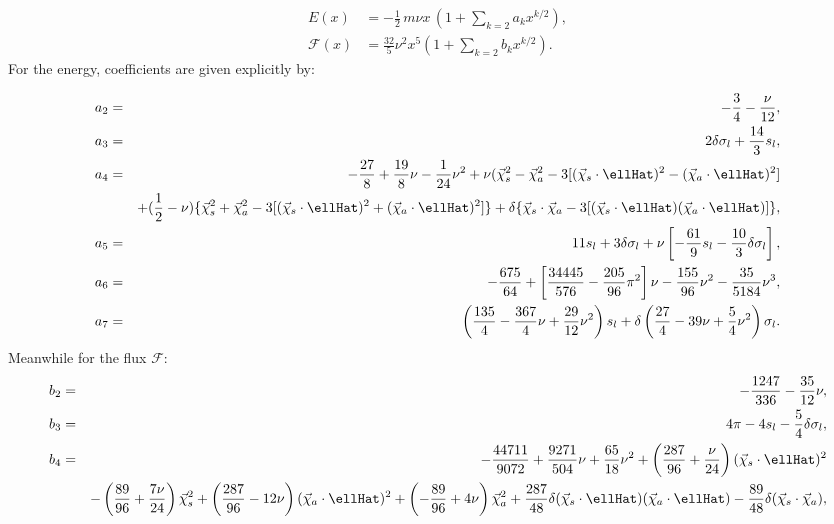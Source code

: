 \begin{eqnarray}
E(x) &= -\frac{1}{2}\,m\nu x\,\left(1+\sum_{k=2}a_{k}x^{k/2}\right), \label{eq:EExpansion} \\
\mathcal{F}(x) &= \frac{32}{5}\nu^{2}x^{5}\left(1+\sum_{k=2}
  b_{k}x^{k/2}\right).
\label{eq:FExpansion}
\end{eqnarray}
For the energy, coefficients are given explicitly by:
\begin{widetext}
\begin{eqnarray}
a_{2} &=& -\frac{3}{4} - \frac{\nu}{12}, \\
a_{3} &=&  2\delta\sigma_{l}+\frac{14}{3}s_{l}, \\
a_{4} &=& -\frac{27}{8} + \frac{19}{8}\nu - \frac{1}{24}\nu^{2} +
\nu{(\vec{\chi}_{s}^{2}-\vec{\chi}_{a}^{2} -
  3[(\vec{\chi}_{s}\cdot\ellHat)^{2} -
  (\vec{\chi}_{a}\cdot\ellHat)^{2}]} \nonumber \\
  &&+ (\frac{1}{2}-\nu)\{ \vec{\chi}_{s}^{2}+\vec{\chi}_{a}^2-3[(\vec{\chi}_{s}\cdot\ellHat)^{2} + (\vec{\chi}_{a}\cdot\ellHat)^{2}]\}+\delta\{\vec{\chi}_{s}\cdot\vec{\chi}_{a} - 3[(\vec{\chi}_{s}\cdot\ellHat)(\vec{\chi}_{a}\cdot\ellHat)]\},
\label{eq:Energy-a4}\\
a_{5} &=& 11s_{l} + 3\delta\sigma_{l} + \nu\left[-\frac{61}{9}s_{l} - \frac{10}{3}\delta\sigma_{l}\right],\\
a_{6} & =& -\frac{675}{64} + \left[\frac{34445}{576}-\frac{205}{96}\pi^{2}\right]\nu - \frac{155}{96}\nu^{2}-\frac{35}{5184}\nu^{3},\\
a_{7} &=& \left(\frac{135}{4} - \frac{367}{4}\nu + \frac{29}{12}\nu^{2}\right)s_{l} + \delta\left(\frac{27}{4}-39\nu+\frac{5}{4}\nu^{2}\right)\sigma_l.
\end{eqnarray}
Meanwhile for the flux $\mathcal{F}$:
\begin{eqnarray}
b_{2} &=& -\frac{1247}{336}-\frac{35}{12}\nu, \\
b_{3} &=& 4\pi - 4s_l - \frac{5}{4}\delta\sigma_{l}, \\
b_{4} &=& -\frac{44711}{9072} + \frac{9271}{504}\nu + \frac{65}{18}\nu^{2}  + \left(\frac{287}{96}+\frac{\nu}{24}\right)(\vec{\chi}_{s}\cdot\ellHat)^{2}\nonumber\\
&&- \left(\frac{89}{96}+\frac{7\nu}{24}\right)\vec{\chi}_{s}^{2} + \left(\frac{287}{96}-12\nu\right)(\vec{\chi}_{a}\cdot\ellHat)^{2} + \left(-\frac{89}{96}+4\nu\right)\vec{\chi}_{a}^{2} + \frac{287}{48}\delta(\vec{\chi}_{s}\cdot\ellHat)(\vec{\chi}_{a}\cdot\ellHat) - \frac{89}{48}\delta(\vec{\chi}_{s}\cdot\vec{\chi}_{a}),
\label{eq:Flux-b4}
\\

\end{eqnarray}
\end{widetext}
